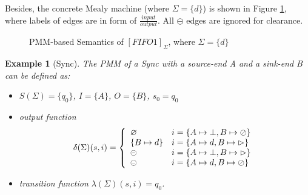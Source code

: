 \documentclass[conference, a4paper]{IEEEtran}
\newtheorem{example}{Example}
\newcommand{\rblock}[0]{\circleddash}
\newcommand{\rread}[0]{\rhd}
\newcommand{\rnoread}[0]{\oslash}
\newcommand{\smap}[1]{[{#1}]}
\newcommand{\rempty}[0]{\varnothing}
\begin{document}
Besides, the concrete Mealy machine (where $\Sigma=\{d\}$) is shown in Figure \ref{fig:pmmfifo},
where labels of edges are in form of $\frac{input}{output}$. All $\rblock$ edges are ignored for
clearance.
\begin{figure}[ht]
  \begin{center}
    
  \end{center}
  \caption{PMM-based Semantics of $\smap{FIFO1}_\Sigma$, where $\Sigma=\{d\}$}
  \label{fig:pmmfifo}
\end{figure}

\begin{example}[Sync]
  The PMM of a Sync with a source-end A and a sink-end B can be defined as:
  \begin{itemize}
    \item[-] $S(\Sigma)=\{q_0\}$, $I=\{A\}$, $O=\{B\}$, $s_0=q_0$
    \item[-] output function
      \begin{displaymath}
        \delta(\Sigma)(s,i)=\left\{
        \begin{array}[ht]{ll}
          \rempty & i=\{A\mapsto\bot,B\mapsto\rnoread\} \\
          \{B\mapsto d\} & i=\{A\mapsto d,B\mapsto\rread\}\\
          \rblock & i=\{A\mapsto\bot,B\mapsto\rread\} \\
          \rblock & i=\{A\mapsto d,B\mapsto\rnoread\} \\
        \end{array}
        \right.
      \end{displaymath}
    \item[-] transition function $\lambda(\Sigma)(s,i)=q_0$.
  \end{itemize}
\end{example}
\end{document}
